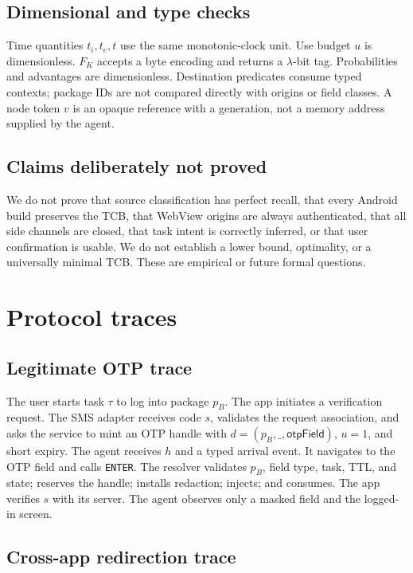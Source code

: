 \subsection{Dimensional and type checks}

Time quantities $t_i,t_e,t$ use the same monotonic-clock unit. Use budget $u$ is dimensionless. $F_K$ accepts a byte encoding and returns a $\lambda$-bit tag. Probabilities and advantages are dimensionless. Destination predicates consume typed contexts; package IDs are not compared directly with origins or field classes. A node token $v$ is an opaque reference with a generation, not a memory address supplied by the agent.

\subsection{Claims deliberately not proved}

We do not prove that source classification has perfect recall, that every Android build preserves the TCB, that WebView origins are always authenticated, that all side channels are closed, that task intent is correctly inferred, or that user confirmation is usable. We do not establish a lower bound, optimality, or a universally minimal TCB. These are empirical or future formal questions.

\section{Protocol traces}

\subsection{Legitimate OTP trace}

The user starts task $\tau$ to log into package $p_B$. The app initiates a verification request. The SMS adapter receives code $s$, validates the request association, and asks the service to mint an OTP handle with $d=(p_B,\_,\mathsf{otpField})$, $u=1$, and short expiry. The agent receives $h$ and a typed arrival event. It navigates to the OTP field and calls \texttt{ENTER}. The resolver validates $p_B$, field type, task, TTL, and state; reserves the handle; installs redaction; injects; and consumes. The app verifies $s$ with its server. The agent observes only a masked field and the logged-in screen.

\subsection{Cross-app redirection trace}

